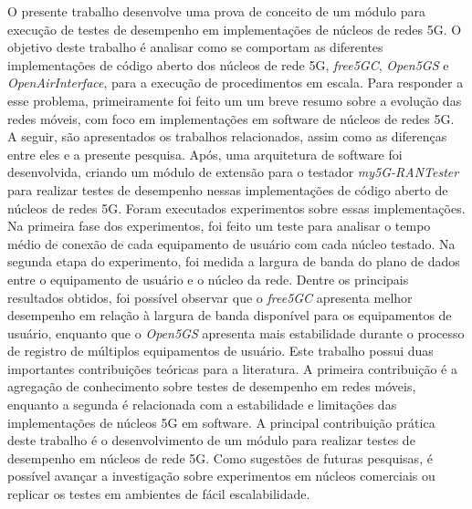 O presente trabalho desenvolve uma prova de conceito de um módulo para execução de testes de desempenho em implementações de núcleos de redes 5G.
O objetivo deste trabalho é analisar como se comportam as diferentes implementações de código aberto dos núcleos de rede 5G, \textit{free5GC}, \textit{Open5GS} e \textit{OpenAirInterface}, para a execução de procedimentos em escala.
Para responder a esse problema, primeiramente foi feito um um breve resumo sobre a evolução das redes móveis, com foco em implementações em software de núcleos de redes 5G.
A seguir, são apresentados os trabalhos relacionados, assim como as diferenças entre eles e a presente pesquisa.
Após, uma arquitetura de software foi desenvolvida, criando um módulo de extensão para o testador \textit{my5G-RANTester} para realizar testes de desempenho nessas implementações de código aberto de núcleos de redes 5G.
Foram executados experimentos sobre essas implementações.
Na primeira fase dos experimentos, foi feito um teste para analisar o tempo médio de conexão de cada equipamento de usuário com cada núcleo testado. Na segunda etapa do experimento, foi medida a largura de banda do plano de dados entre o equipamento de usuário e o núcleo da rede.
Dentre os principais resultados obtidos, foi possível observar que o \textit{free5GC} apresenta melhor desempenho em relação à largura de banda disponível para os equipamentos de usuário, enquanto que o \textit{Open5GS} apresenta mais estabilidade durante o processo de registro de múltiplos equipamentos de usuário.
Este trabalho possui duas importantes contribuições teóricas para a literatura. A primeira contribuição é a agregação de conhecimento sobre testes de desempenho em redes móveis, enquanto a segunda é relacionada com a estabilidade e limitações das implementações de núcleos 5G em software.
A principal contribuição prática deste trabalho é o desenvolvimento de um módulo para realizar testes de desempenho em núcleos de rede 5G.
Como sugestões de futuras pesquisas, é possível avançar a investigação sobre experimentos em núcleos comerciais ou replicar os testes em ambientes de fácil escalabilidade.

